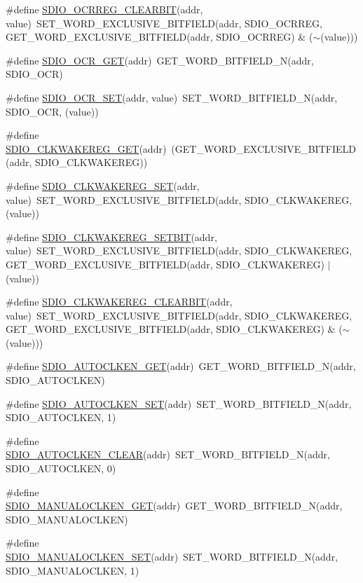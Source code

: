 \begin{DoxyCompactItemize}
\item 
\#define \hyperlink{a00570_ad967707628f3e23b4c7546c621d216ef}{SDIO\_\-OCRREG\_\-CLEARBIT}(addr, value)~SET\_\-WORD\_\-EXCLUSIVE\_\-BITFIELD(addr, SDIO\_\-OCRREG, GET\_\-WORD\_\-EXCLUSIVE\_\-BITFIELD(addr, SDIO\_\-OCRREG) \& ($\sim$(value)))
\item 
\#define \hyperlink{a00570_aaefdac7f54871989a8ece0005ddbb667}{SDIO\_\-OCR\_\-GET}(addr)~GET\_\-WORD\_\-BITFIELD\_\-N(addr, SDIO\_\-OCR)
\item 
\#define \hyperlink{a00570_ac7eb4e45cec051e682e3ec16e0762d04}{SDIO\_\-OCR\_\-SET}(addr, value)~SET\_\-WORD\_\-BITFIELD\_\-N(addr, SDIO\_\-OCR, (value))
\item 
\#define \hyperlink{a00570_ad3606617d9bbf42dc98989db369fddff}{SDIO\_\-CLKWAKEREG\_\-GET}(addr)~(GET\_\-WORD\_\-EXCLUSIVE\_\-BITFIELD(addr, SDIO\_\-CLKWAKEREG))
\item 
\#define \hyperlink{a00570_a603b6e1d375a3bdcde7c51f10c948794}{SDIO\_\-CLKWAKEREG\_\-SET}(addr, value)~SET\_\-WORD\_\-EXCLUSIVE\_\-BITFIELD(addr, SDIO\_\-CLKWAKEREG, (value))
\item 
\#define \hyperlink{a00570_a9fa1b5bc96fdcd0765ef49d406ab220a}{SDIO\_\-CLKWAKEREG\_\-SETBIT}(addr, value)~SET\_\-WORD\_\-EXCLUSIVE\_\-BITFIELD(addr, SDIO\_\-CLKWAKEREG, GET\_\-WORD\_\-EXCLUSIVE\_\-BITFIELD(addr, SDIO\_\-CLKWAKEREG) $|$ (value))
\item 
\#define \hyperlink{a00570_a8211ed5f1997d3577e54535b8f8199ed}{SDIO\_\-CLKWAKEREG\_\-CLEARBIT}(addr, value)~SET\_\-WORD\_\-EXCLUSIVE\_\-BITFIELD(addr, SDIO\_\-CLKWAKEREG, GET\_\-WORD\_\-EXCLUSIVE\_\-BITFIELD(addr, SDIO\_\-CLKWAKEREG) \& ($\sim$(value)))
\item 
\#define \hyperlink{a00570_a9573dd7876ca8c95cd0a4b5473e073c5}{SDIO\_\-AUTOCLKEN\_\-GET}(addr)~GET\_\-WORD\_\-BITFIELD\_\-N(addr, SDIO\_\-AUTOCLKEN)
\item 
\#define \hyperlink{a00570_a76740b9fb992cfa6a37f3e1ce5aa73e4}{SDIO\_\-AUTOCLKEN\_\-SET}(addr)~SET\_\-WORD\_\-BITFIELD\_\-N(addr, SDIO\_\-AUTOCLKEN, 1)
\item 
\#define \hyperlink{a00570_a7ecc626a5b057fea17b95d4273f14fd2}{SDIO\_\-AUTOCLKEN\_\-CLEAR}(addr)~SET\_\-WORD\_\-BITFIELD\_\-N(addr, SDIO\_\-AUTOCLKEN, 0)
\item 
\#define \hyperlink{a00570_a9b3fb004705fb62eb0b82700d5d9a11a}{SDIO\_\-MANUALOCLKEN\_\-GET}(addr)~GET\_\-WORD\_\-BITFIELD\_\-N(addr, SDIO\_\-MANUALOCLKEN)
\item 
\#define \hyperlink{a00570_a06744058030886d34fa2e69fe6e2268f}{SDIO\_\-MANUALOCLKEN\_\-SET}(addr)~SET\_\-WORD\_\-BITFIELD\_\-N(addr, SDIO\_\-MANUALOCLKEN, 1)

\end{DoxyCompactItemize}
